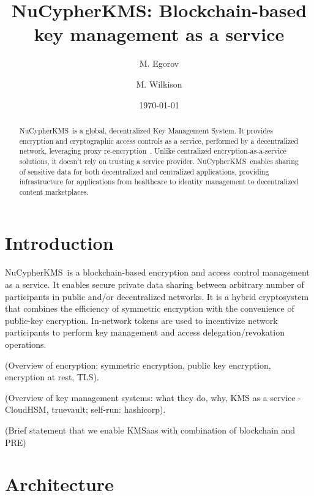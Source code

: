 \documentclass[notitlepage,longbibliography]{revtex4-1}
\newcommand{\kms}{NuCypherKMS}
\begin{document}
\title{\kms: Blockchain-based key management as a service}

\author{M. Egorov}
\author{M. Wilkison}


\begin{abstract}
    \kms~is a global, decentralized Key Management System.
    It provides encryption and cryptographic access controls as a service, performed by a decentralized network,
    leveraging proxy re-encryption~\cite{wiki:pre}.
    Unlike centralized encryption-as-a-service solutions, it doesn't rely on trusting a service provider.
    \kms~enables sharing of sensitive data for both decentralized and centralized applications,
    providing infrastructure for applications from healthcare to identity management to decentralized content marketplaces.
\end{abstract}

\date{\today}
\maketitle

\newpage
\tableofcontents
\newpage

\section{Introduction}

\kms~is a blockchain-based encryption and access control management as a service.
It enables secure private data sharing between arbitrary number of participants in public and/or decentralized networks.
It is a hybrid cryptosystem that combines the efficiency of symmetric encryption with the convenience of public-key encryption.
In-network tokens are used to incentivize network participants to perform key management and access delegation/revokation operations.

(Overview of encryption: symmetric encryption, public key encryption, encryption at rest, TLS).

(Overview of key management systems: what they do, why, KMS as a service - CloudHSM, truevault; self-run: hashicorp).

(Brief statement that we enable KMSaas with combination of blockchain and PRE)

\section{Architecture}
\end{document}
